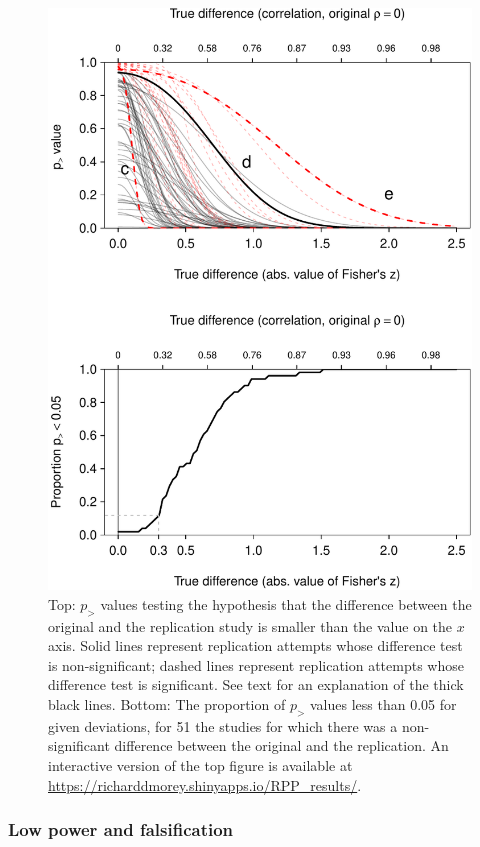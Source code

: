 \documentclass[doc,a4paper,floatsintext,draftfirst]{apa6}
\makeatletter
\def\maxwidth{ %
  \ifdim\Gin@nat@width>\linewidth
    \linewidth
  \else
    \Gin@nat@width
  \fi
}
\makeatother
\begin{document}
\begin{figure}
\includegraphics[width=.9\maxwidth]{figure/severity2-1} \caption[Top]{Top: $p_{>}$ values testing the hypothesis that the difference between the original and the replication study is smaller than the value on the $x$ axis. Solid lines represent replication attempts whose difference test is non-significant; dashed lines represent replication attempts whose difference test is significant. See text for an explanation of the thick black lines. Bottom: The proportion of $p_{>}$ values less than 0.05 for given deviations, for 51 the studies for which there was a non-significant difference between the original and the replication. An interactive version of the top figure is available at \protect\url{https://richarddmorey.shinyapps.io/RPP_results/}.}\label{fig:pv_curve2}
\end{figure}

\subsubsection{Low power and falsification}
\end{document}
